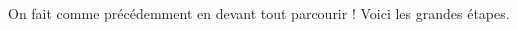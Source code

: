 On fait comme précédemment en devant tout parcourir !
Voici les grandes étapes.

\begin{multicols}{2}


\phantom{\emptybox\emptybox}%
	\deah

\emptybox\emptybox%
\emptybox\emptybox

\emptybox\emptybox%
	\emptybox\emptybox\emptybox\emptybox\emptybox\emptybox\emptybox%
\emptybox\emptybox

\phantom{\emptybox\emptybox}%
	\head


\medskip %

\phantom{\emptybox}%
	\deah

\emptybox\emptybox%
\emptybox\emptybox

\emptybox\emptybox%
\emptybox\emptybox

\phantom{\emptybox\emptybox\emptybox\emptybox\emptybox\emptybox\emptybox\emptybox\emptybox}%
	\head


\vfill\null
\columnbreak %

\phantom{\emptybox\emptybox\emptybox\emptybox\emptybox\emptybox\emptybox\emptybox\emptybox}%
	\deah

\emptybox\emptybox%
\emptybox\emptybox

\emptybox\emptybox%
\emptybox\emptybox

\phantom{\emptybox}%
	\head

\vfill\null
\end{multicols}
